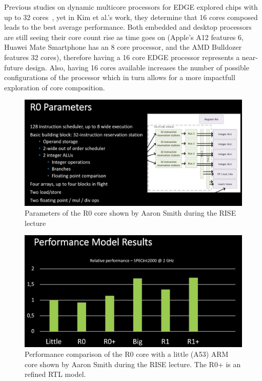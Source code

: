 Previous studies on dynamic multicore processors for EDGE explored chips with up to 32 cores~\cite{kim2007tflex, gulati2008multitaskingdmc}, yet in Kim et al.'s work, they determine that 16 cores composed leads to the best average performance.
Both embedded and desktop processors are still seeing their core count rise as time goes on (Apple's A12 features 6, Huawei Mate Smartphone has an 8 core processor, and the AMD Bulldozer features 32 cores), therefore having a 16 core EDGE processor represents a near-future design.
Also, having 16 cores available increases the number of possible configurations of the processor which in turn allows for a more impactfull exploration of core composition.

\begin{figure}[t]
  \centering
    \includegraphics[width=1\textwidth]{setup/r0_parameters.png}
    \caption{Parameters of the R0 core shown by Aaron Smith during the RISE lecture}\label{fig:r0}
\end{figure}

\begin{figure}[t]
  \centering
    \includegraphics[width=1\textwidth]{setup/results.png}
    \caption{Performance comparison of the R0 core with a little (A53) ARM core shown by Aaron Smith during the RISE lecture. The R0+ is an refined RTL model.}\label{fig:r0perf}
\end{figure}

